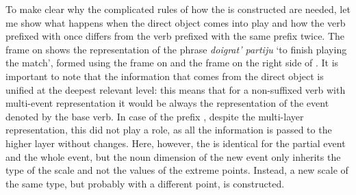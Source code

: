 To make clear why the complicated rules of how the  is constructed are needed, let me show what happens when the direct object comes into play and how the verb prefixed with  once differs from the verb prefixed with the same prefix twice. The frame on  shows the representation of the phrase \textit{doigrat' partiju} `to finish playing the match', formed using the frame on  and the frame on the right side of . It is important to note that the information that comes from the direct object is unified at the deepest relevant level: this means that for a non-suffixed verb with multi-event representation it would be always the representation of the event denoted by the base verb. In case of the prefix , despite the multi-layer representation, this did not play a role, as all the information is passed to the higher layer without changes. Here, however, the \THEME is identical for the partial event and the whole event, but the noun dimension of the new event only inherits the type of the scale and not the values of the extreme points. Instead, a new scale of the same type, but probably with a different \MIN point, is constructed.

